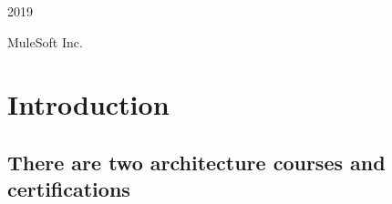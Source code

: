 \begin{titlepage}
 \vspace{0.5\baselineskip} %

 \textit{} %

 \vfill %



 \vspace{0.3\baselineskip} %

 2019 %

  {\large MuleSoft Inc.} %

\end{titlepage}


\newpage




\tableofcontents


\chapter{Introduction}

\section{There are two architecture courses and certifications}

